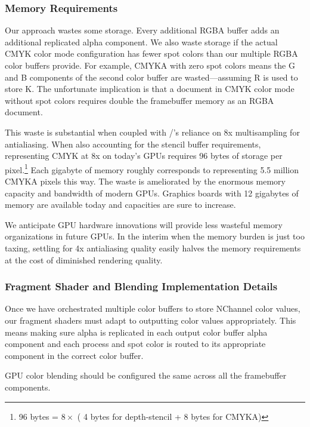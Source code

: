 \subsubsection{Memory Requirements}
\label{sec:memory}

Our approach wastes some storage.
Every additional RGBA buffer adds an
additional replicated alpha component.  We also waste storage if the actual CMYK color mode configuration
has fewer spot colors than our multiple RGBA color buffers provide.  For example, CMYKA with zero spot
colors means the G and B components of the second color buffer are wasted---assuming R is used to store K.
The unfortunate implication is that a document in CMYK color mode without spot colors requires double
the framebuffer memory as an RGBA document.

This waste is substantial when coupled with \Illustrator/'s reliance on 8x multisampling for antialiasing.
When also accounting for the stencil buffer requirements, representing CMYK at 8x on today's GPUs requires 96 bytes
of storage per pixel.\footnote{96 bytes = $8 \times$ ( 4 bytes for depth-stencil + 8 bytes for CMYKA)}  
Each gigabyte of memory roughly corresponds to
representing 5.5 million CMYKA pixels this way.
The waste is ameliorated by the enormous memory capacity and bandwidth of modern GPUs.
Graphics boards with 12 gigabytes of memory are available today and capacities are sure to increase.

We anticipate GPU hardware innovations
will provide less wasteful memory organizations in future GPUs. In the interim
when the memory burden is just too taxing, settling for 4x antialiasing quality
easily halves the memory requirements at the cost of diminished rendering quality.

\subsubsection{Fragment Shader and Blending Implementation Details}
\label{sec:tweaks}

Once we have orchestrated multiple color buffers to store NChannel color values, our fragment shaders
must adapt to outputting color values appropriately.  This means making sure alpha is replicated in each
output color buffer alpha component and each process and spot color
is routed to its appropriate component in the correct color buffer.  

GPU color blending should be configured the same across all the framebuffer components.

